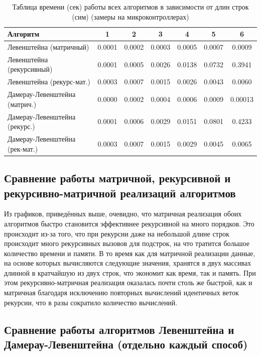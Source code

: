 \begin{table}[H]
    \centering
    \begin{tabular}{|l|c|c|c|c|c|c|}
        \hline
        \textbf{Алгоритм} & \textbf{1} & \textbf{2} & \textbf{3} & \textbf{4} & \textbf{5} & \textbf{6}\\
        \hline
        Левенштейна (матричный) & 0.0001 & 0.0002 & 0.0003 & 0.0005 & 0.0007 & 0.0009 \\
        Левенштейна (рекурсивный) & 0.0001 & 0.0005 & 0.0026 & 0.0138 & 0.0732 & 0.3941 \\
        Левенштейна (рекурс-мат.) & 0.0003 & 0.0007 & 0.0015 & 0.0026 & 0.0043 & 0.0060 \\
        Дамерау-Левенштейна (матрич.) & 0.0000 & 0.0002 & 0.0004 & 0.0006 & 0.0009 & 0.00013 \\
        Дамерау-Левенштейна (рекурс.) & 0.0001 & 0.0006 & 0.0029 & 0.0151 & 0.0801 & 0.4233 \\
        Дамерау-Левенштейна (рек-мат.) & 0.0003 & 0.0007 & 0.0015 & 0.0029 & 0.0045 & 0.0065 \\
        \hline
    \end{tabular}
    \caption{Таблица времени (сек) работы всех алгоритмов в зависимости от длин строк (сим) (замеры на микроконтроллерах)}
    \label{table:table_all_micro}
\end{table}

\subsection{Сравнение работы матричной, рекурсивной и рекурсивно-матричной реализаций алгоритмов}

\hspace{1.25cm}
Из графиков, приведённых выше, очевидно, что матричная реализация обоих алгоритмов быстро становится эффективнее рекурсивной на много порядков. Это происходит из-за того, что при рекурсии даже на небольшой длине строк происходит много рекурсивных вызовов для подстрок, на что тратится большое количество времени и памяти. В то время как для матричной реализации данные, на основе которых вычисляются следующие значения, хранятся в двух массивах длинной в кратчайшую из двух строк, что экономит как время, так и память. При этом рекурсивно-матричная реализация оказалась почти столь же быстрой, как и матричная благодаря исключению повторных вычислений идентичных веток рекурсии, что в разы сократило количество вычислений.

\subsection{Сравнение работы алгоритмов Левенштейна и Дамерау-Левенштейна (отдельно каждый способ)}

